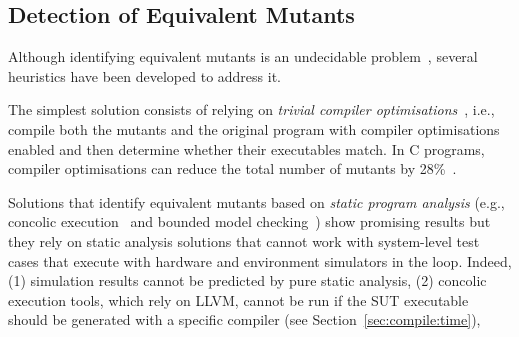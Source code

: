 \subsection{Detection of Equivalent Mutants}
\label{sec:background:equivalent}

Although identifying equivalent mutants is an undecidable problem~\cite{madeyski2013overcoming,Bugg:Correctness:82}, several heuristics have been developed to address it.

The simplest solution consists of relying on \emph{trivial compiler optimisations}~\cite{papadakis2015trivial, kintis2017detecting,papadakis2019mutation}, i.e., compile both the mutants and the original program with compiler optimisations enabled and then determine whether their executables match. In C programs, compiler optimisations can reduce the total number of mutants by 28\%~\cite{kintis2017detecting}.



Solutions that identify equivalent mutants based on \emph{static program analysis} (e.g., concolic execution~\cite{holling2016nequivack,Chekam2021} and bounded model checking~\cite{riener2011test})
show promising results  but
they rely on static analysis solutions that cannot work with system-level test cases that execute with hardware and environment simulators in the loop.
Indeed, (1) simulation results cannot be predicted by pure static analysis,  (2) concolic execution tools, which rely on LLVM, cannot be run if the SUT executable should be generated with a specific compiler (see Section~\ref{sec:compile:time}),

